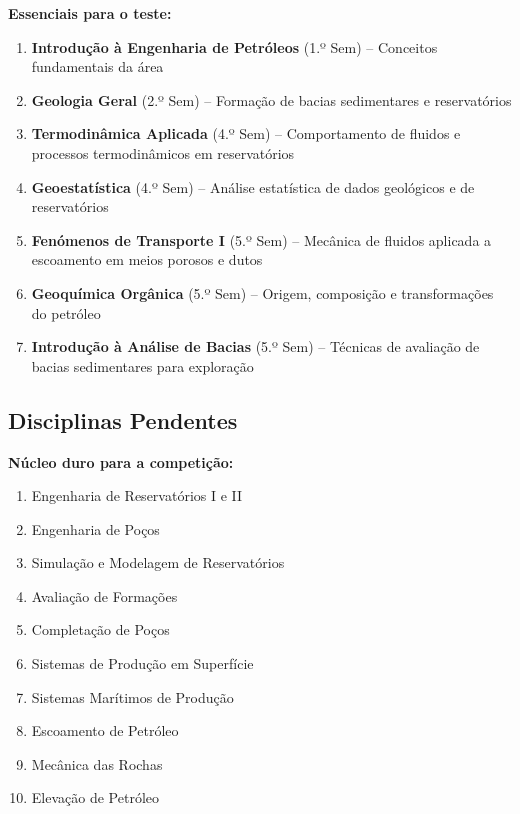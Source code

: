 \documentclass[11pt,a4paper]{article}
\begin{document}
\textbf{Essenciais para o teste:}

\begin{enumerate}
  \item \textbf{Introdução à Engenharia de Petróleos} (1.º Sem) – Conceitos fundamentais da área
  \item \textbf{Geologia Geral} (2.º Sem) – Formação de bacias sedimentares e reservatórios
  \item \textbf{Termodinâmica Aplicada} (4.º Sem) – Comportamento de fluidos e processos termodinâmicos em reservatórios
  \item \textbf{Geoestatística} (4.º Sem) – Análise estatística de dados geológicos e de reservatórios
  \item \textbf{Fenómenos de Transporte I} (5.º Sem) – Mecânica de fluidos aplicada a escoamento em meios porosos e dutos
  \item \textbf{Geoquímica Orgânica} (5.º Sem) – Origem, composição e transformações do petróleo
  \item \textbf{Introdução à Análise de Bacias} (5.º Sem) – Técnicas de avaliação de bacias sedimentares para exploração
\end{enumerate}

\subsection*{Disciplinas Pendentes}

\textbf{Núcleo duro para a competição:}

\begin{enumerate}
  \item Engenharia de Reservatórios I e II
  \item Engenharia de Poços
  \item Simulação e Modelagem de Reservatórios
  \item Avaliação de Formações
  \item Completação de Poços
  \item Sistemas de Produção em Superfície
  \item Sistemas Marítimos de Produção
  \item Escoamento de Petróleo
  \item Mecânica das Rochas
  \item Elevação de Petróleo
\end{enumerate}

\newpage

\end{document}
